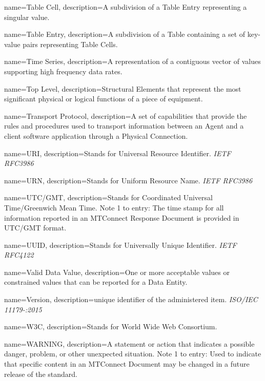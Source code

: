 {
    name={Table Cell},
	description={A subdivision of a \gls{Table Entry} representing a singular value.}
}

{
    name={Table Entry},
	description={A subdivision of a \gls{Table} containing a set of \glspl{key-value pair} representing \glspl{Table Cell}.}
}

{
    name={Time Series},
	description={A  representation of a contiguous vector of values supporting high frequency data rates.}
}

{
    name={Top Level},
	description={\glspl{Structural Element} that represent the most significant physical or logical functions of a piece of equipment.}
}

{
    name={Transport Protocol},
	description={A set of capabilities that provide the rules and procedures used to transport information between an \gls{Agent} and a client software application through a \gls{Physical Connection}.}
}

{
    name={URI},
	description={Stands for Universal Resource Identifier. \textit{IETF RFC3986}
}
}

{
    name={URN},
	description={Stands for Uniform Resource Name. \textit{IETF RFC3986}
}
}

{
    name={UTC/GMT},
	description={Stands for Coordinated Universal Time/Greenwich Mean Time.  
Note 1 to entry: The \gls{time stamp} for all information reported in an \gls{MTConnect Response Document} is provided in UTC/GMT format.}
}

{
    name={UUID},
	description={Stands for Universally Unique Identifier.  \textit{IETF RFC4122}}
}

{
    name={Valid Data Value},
	description={One or more acceptable values or constrained values that can be reported for a \gls{Data Entity}.}
}

{
    name={Version},
	description={unique identifier of the administered item. \textit{ISO/IEC 11179-:2015}}
}

{
    name={W3C},
	description={Stands for World Wide Web Consortium.}
}

{
    name={WARNING},
	description={A statement or action that indicates a possible danger, problem, or other unexpected situation.
Note 1 to entry: Used to indicate that specific content in an \gls{MTConnect Document} may be changed in a future release of the standard.}
}

